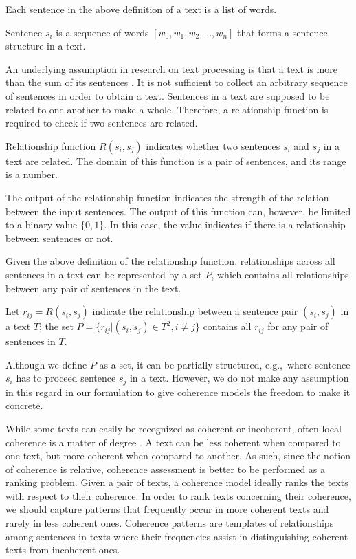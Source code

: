 Each sentence in the above definition of a text is a list of words.

\begin{definition}
Sentence $s_i$ is a sequence of words $[w_0, w_1, w_2, ... , w_n]$ that forms a sentence structure in a text. 
\end{definition}

An underlying assumption in research on text processing is that a text is more than the sum of its sentences \cite{webber12a}. 
It is not sufficient to collect an arbitrary sequence of sentences in order to obtain a text. 
Sentences in a text are supposed to be related to one another to make a whole. 
Therefore, a relationship function is required to check if two sentences are related. 

\begin{definition}
Relationship function $R(s_i,s_j)$ indicates whether two sentences $s_i$ and $s_j$ in a text are related. 
The domain of this function is a pair of sentences, and its range is a number. 
\end{definition} 

The output of the relationship function indicates the strength of the relation between the input sentences.  
The output of this function can, however, be limited to a binary value $\lbrace 0,1\rbrace$. 
In this case, the value indicates if there is a relationship between sentences or not. 

Given the above definition of the relationship function, relationships across all sentences in a text can be represented by a set $P$, which contains all relationships between any pair of sentences in the text. 

\begin{definition}
Let $r_{ij}= R(s_i,s_j)$ indicate the relationship between a sentence pair $(s_i,s_j)$ in a text $T$; the set $P = \lbrace r_{ij}| (s_i,s_j) \in T^2, i \neq j \rbrace$ contains all $r_{ij}$ for any pair of sentences in $T$.
\end{definition}  

Although we define $P$ as a set, it can be partially structured, e.g.,\ where sentence $s_i$ has to proceed sentence $s_j$ in a text. 
However, we do not make any assumption in this regard in our formulation to give coherence models the freedom to make it concrete. 

While some texts can easily be recognized as coherent or incoherent, often local coherence is a matter of degree \cite{halliday76}. 
A text can be less coherent when compared to one text, but more coherent when compared to another. 
As such, since the notion of coherence is relative, coherence assessment is better to be performed as a ranking problem. 
Given a pair of texts, a coherence model ideally ranks the texts with respect to their coherence.
In order to rank texts concerning their coherence, we should capture patterns that frequently occur in more coherent texts and rarely in less coherent ones.  
Coherence patterns are templates of relationships among sentences in texts where their frequencies assist in distinguishing coherent texts from incoherent ones. 

